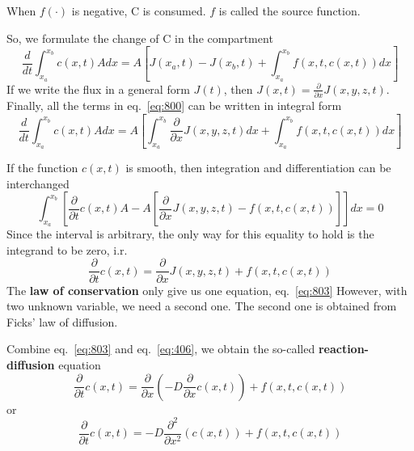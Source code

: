 \begin{framed}
  When $f(\cdot)$ is negative, C is consumed. $f$ is called the source
  function. 
\end{framed}

So, we formulate the change of C in the compartment
\begin{equation}
  \label{eq:800}
  \frac{d}{dt}\int_{x_a}^{x_b} c(x,t) A dx = A[J(x_a,t)-J(x_b,t) + \int_{x_a}^{x_b} f(x,t,c(x,t)) dx]
\end{equation}
If we write the flux in a general form $J(t)$, then
$J(x,t)=\frac{\partial}{\partial x} J(x,y,z,t)$. 
Finally, all the terms in eq.~\eqref{eq:800} can be written in
integral form
\begin{equation}
  \label{eq:801}
  \frac{d}{dt}\int_{x_a}^{x_b} c(x,t) A dx =
  A[\int_{x_a}^{x_b}\frac{\partial}{\partial x} J(x,y,z,t) dx  + \int_{x_a}^{x_b} f(x,t,c(x,t)) dx]  
\end{equation}

If the function $c(x,t)$ is smooth, then integration and
differentiation can be interchanged 
\begin{equation}
  \label{eq:802}
  \int_{x_a}^{x_b}\left[  \frac{\partial}{\partial t} c(x,t) A  -
  A[\frac{\partial}{\partial x} J(x,y,z,t)   -  f(x,t,c(x,t)) ]\right]
dx = 0
\end{equation}
Since the interval is arbitrary, the only way for this equality to
hold is the integrand to be zero, i.r. 
\begin{equation}
  \label{eq:803}
  \frac{\partial}{\partial t} c(x,t)  =
    \frac{\partial}{\partial x} J(x,y,z,t)   +  f(x,t,c(x,t)) 
\end{equation}
The {\bf law of conservation} only give us one equation, eq.~\eqref{eq:803}
However, with two unknown variable, we need a second one. The second
one is obtained from Ficks' law of diffusion.


Combine eq.~\eqref{eq:803} and eq.~\eqref{eq:406}, we obtain the
so-called {\bf reaction-diffusion} equation
\begin{equation}
  \label{eq:804}
  \frac{\partial}{\partial t} c(x,t) =
  \frac{\partial}{\partial x} \left( -D\frac{\partial}{\partial x}
    c(x,t) \right)   +  f(x,t,c(x,t)) 
\end{equation}
or
\begin{equation}
  \label{eq:805}
  \frac{\partial}{\partial t} c(x,t) = - D\frac{\partial^2}{\partial x^2} 
  \left(c(x,t) \right)   + f(x,t,c(x,t)) 
\end{equation}

